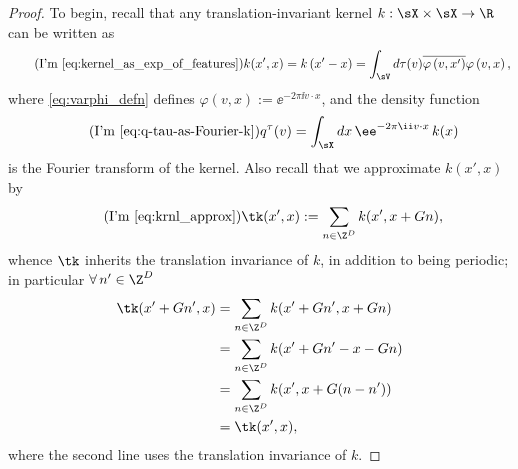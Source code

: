 \begin{proof}
  To begin, recall that any translation-invariant kernel $k:\sX\times\sX\to\R$ can be written as
  \begin{equation*}
    \tag{I'm \ref{eq:kernel_as_exp_of_features}}
    k(x',x)=k\left(x'-x\right)=\int_\sV d\tau(v)\overline{\varphi\left(v,x'\right)}\varphi\left(v,x\right),
  \end{equation*}
  where \cref{eq:varphi_defn} defines $\varphi(v,x):=\ee^{-2\pi\ii v\cdot x}$, and the density function
  \begin{equation*}
    \tag{I'm \ref{eq:q-tau-as-Fourier-k}}
    q^{\tau}(v)=\int_\sX dx\,\ee^{-2\pi\ii v\cdot x}\,k(x)
  \end{equation*}
  is the Fourier transform of the kernel.
  Also recall that we approximate $k(x',x)$ by
  \begin{equation*}
    \tag{I'm \ref{eq:krnl_approx}}
    \tk(x',x):=\sum_{n\in\Z^D}k(x',x+Gn),
  \end{equation*}
  whence $\tk$ inherits the translation invariance of $k$, in addition to being periodic; in particular $\forall\, n'\in\Z^D$ 
  \begin{align*}
    \label{eq:periodicity}
    \tk(x'+Gn',x)&=\sum_{n\in\Z^D}k(x'+Gn',x+Gn)\\
                &=\sum_{n\in\Z^D}k(x'+Gn'-x-Gn) \\ %
                &=\sum_{n\in\Z^D}k(x',x+G(n-n'))\\
                &=\tk(x',x),
  \end{align*}
where the second line uses the translation invariance of $k$.


\end{proof}
